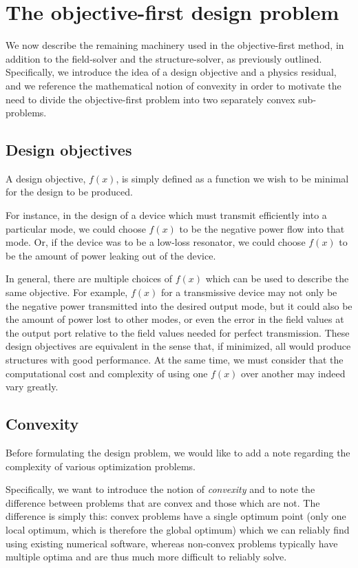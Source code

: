 
\section{The objective-first design problem}
We now describe the remaining machinery used in the objective-first method,
    in addition to the field-solver and the structure-solver,
    as previously outlined.
Specifically, we introduce the idea of a design objective and a physics residual,
    and we reference the mathematical notion of convexity
    in order to motivate the need to divide the 
    objective-first problem into two separately convex sub-problems.

\subsection{Design objectives} \label{sec:desobj}
A design objective, $f(x)$, is simply defined as
    a function we wish to be minimal 
    for the design to be produced.

For instance, in the design of a device
    which must transmit efficiently into a particular mode,
    we could choose $f(x)$ to be the negative power flow into that mode.
Or, if the device was to be a low-loss resonator,
    we could choose $f(x)$ to be the amount of power leaking 
    out of the device.

In general, there are multiple choices of $f(x)$
    which can be used to describe the same objective.
For example, $f(x)$ for a transmissive device 
    may not only be the negative power transmitted into the desired output mode,
    but it could also be the amount of power lost to other modes,
    or even the error in the field values at the output port
    relative to the field values needed for perfect transmission.
These design objectives are equivalent in the sense that, if minimized, 
    all would produce structures with good performance.
At the same time, we must consider that the computational cost and complexity
    of using one $f(x)$ over another may indeed vary greatly.

\subsection{Convexity}
Before formulating the design problem,
    we would like to add a note regarding the complexity of various 
    optimization problems.

Specifically, we want to introduce the notion of \emph{convexity}\cite{boyd}
    and to note the difference between problems that
    are convex and those which are not.
The difference is simply this:
    convex problems have a single optimum point
    (only one local optimum, which is therefore the global optimum)
    which we can reliably find using existing numerical software,
    whereas non-convex problems typically have multiple optima 
    and are thus much more difficult to reliably solve.

